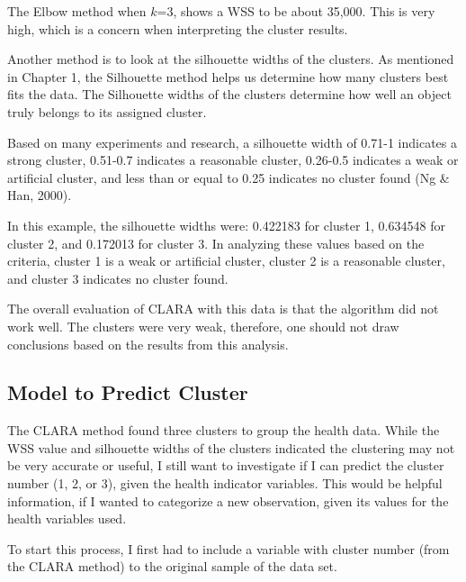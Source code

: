 \documentclass[12pt,twoside]{amherstthesis}
\begin{document}
  The Elbow method when \(k\)=3, shows a WSS to be about 35,000. This is
  very high, which is a concern when interpreting the cluster results.
  
  Another method is to look at the silhouette widths of the clusters. As
  mentioned in Chapter 1, the Silhouette method helps us determine how
  many clusters best fits the data. The Silhouette widths of the clusters
  determine how well an object truly belongs to its assigned cluster.
  
  Based on many experiments and research, a silhouette width of 0.71-1
  indicates a strong cluster, 0.51-0.7 indicates a reasonable cluster,
  0.26-0.5 indicates a weak or artificial cluster, and less than or equal
  to 0.25 indicates no cluster found (Ng \& Han, 2000).
  
  In this example, the silhouette widths were: 0.422183 for cluster 1,
  0.634548 for cluster 2, and 0.172013 for cluster 3. In analyzing these
  values based on the criteria, cluster 1 is a weak or artificial cluster,
  cluster 2 is a reasonable cluster, and cluster 3 indicates no cluster
  found.
  
  The overall evaluation of CLARA with this data is that the algorithm did
  not work well. The clusters were very weak, therefore, one should not
  draw conclusions based on the results from this analysis.
  
  \subsection{Model to Predict Cluster}\label{model-to-predict-cluster}
  
  The CLARA method found three clusters to group the health data. While
  the WSS value and silhouette widths of the clusters indicated the
  clustering may not be very accurate or useful, I still want to
  investigate if I can predict the cluster number (1, 2, or 3), given the
  health indicator variables. This would be helpful information, if I
  wanted to categorize a new observation, given its values for the health
  variables used.
  
  To start this process, I first had to include a variable with cluster
  number (from the CLARA method) to the original sample of the data set.
  
  \begin{Shaded}
  \begin{Highlighting}[]
  \StringTok{ }\OperatorTok{$}
  \StringTok{ }
  \end{Highlighting}
  \end{Shaded}
  
\end{document}
